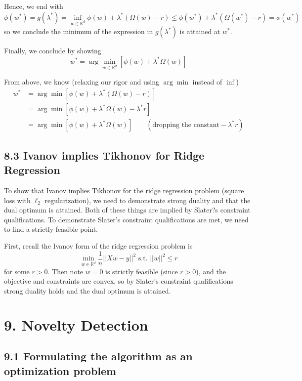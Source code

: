 \documentclass[paper=a4, fontsize=11pt]{scrartcl} %
\numberwithin{equation}{section} %
\numberwithin{figure}{section} %
\numberwithin{table}{section} %
\begin{document}
Hence, we end with
\[\phi(w^*) = g(\lambda^*) =  \inf_{w \in \mathbb{R}^d} \phi(w) + \lambda^*(\Omega(w)-r) \leq \phi(w^*) + \lambda^*(\Omega(w^*)-r) = \phi(w^*)\]
so we conclude the minimum of the expression in $g(\lambda^*)$ is attained at $w^*$.

Finally, we conclude by showing
\[w^* =\arg \min_{w \in \mathbb{R}^d}[ \phi(w) + \lambda^* \Omega(w)]\]

From above, we know (relaxing our rigor and using $\arg \min$ instead of $\inf$)
\begin{align*}
w^* &= \arg \min [\phi(w) + \lambda^*(\Omega(w)-r)] \\
	&= \arg \min [\phi(w) + \lambda^*\Omega(w)-\lambda^*r] \\
	&= \arg \min [\phi(w) + \lambda^*\Omega(w)] \qquad{} (\textrm{dropping the constant} -\lambda^*r)
\end{align*}

\subsection*{8.3 Ivanov implies Tikhonov for Ridge Regression}

To show that Ivanov implies Tikhonov for the ridge regression problem (square loss with $\ell_2$ regularization), we need to demonstrate strong duality and that the dual optimum is attained. Both of these things are implied by Slater?s constraint qualifications. To demonstrate Slater's constraint qualifications are met, we need to find a strictly feasible point.

First, recall the Ivanov form of the ridge regression problem is
\[\min_{w\in\mathbb{R}^d} \frac{1}{n} ||Xw - y||^2 \textrm{ s.t. } ||w||^2 \leq r\]
for some $r > 0$.
Then note $w = 0 $ is strictly feasible (since $r > 0$), and the objective and constraints are convex, so by Slater's constraint qualifications strong duality holds and the dual optimum is attained.


\section*{9. Novelty Detection}
\subsection*{9.1 Formulating the algorithm as an optimization problem}
\end{document}
